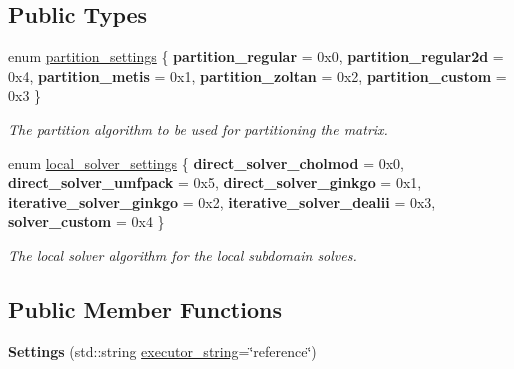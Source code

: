 \subsection*{Public Types}
\begin{DoxyCompactItemize}
\item 
\mbox{\label{structschwz_1_1Settings_a11769093e4aa3ce3340cbf7a67487faa}} 
enum \hyperlink{structschwz_1_1Settings_a11769093e4aa3ce3340cbf7a67487faa}{partition\+\_\+settings} \{ \newline
{\bfseries partition\+\_\+regular} = 0x0, 
{\bfseries partition\+\_\+regular2d} = 0x4, 
{\bfseries partition\+\_\+metis} = 0x1, 
{\bfseries partition\+\_\+zoltan} = 0x2, 
\newline
{\bfseries partition\+\_\+custom} = 0x3
 \}\begin{DoxyCompactList}\small\item\em The partition algorithm to be used for partitioning the matrix. \end{DoxyCompactList}
\item 
\mbox{\label{structschwz_1_1Settings_a31e82310ef6aed08168baef78f0db69e}} 
enum \hyperlink{structschwz_1_1Settings_a31e82310ef6aed08168baef78f0db69e}{local\+\_\+solver\+\_\+settings} \{ \newline
{\bfseries direct\+\_\+solver\+\_\+cholmod} = 0x0, 
{\bfseries direct\+\_\+solver\+\_\+umfpack} = 0x5, 
{\bfseries direct\+\_\+solver\+\_\+ginkgo} = 0x1, 
{\bfseries iterative\+\_\+solver\+\_\+ginkgo} = 0x2, 
\newline
{\bfseries iterative\+\_\+solver\+\_\+dealii} = 0x3, 
{\bfseries solver\+\_\+custom} = 0x4
 \}\begin{DoxyCompactList}\small\item\em The local solver algorithm for the local subdomain solves. \end{DoxyCompactList}
\end{DoxyCompactItemize}
\subsection*{Public Member Functions}
\begin{DoxyCompactItemize}
\item 
\mbox{\label{structschwz_1_1Settings_a00ac65d16e2ef2761fad0095b2ba3086}} 
{\bfseries Settings} (std\+::string \hyperlink{structschwz_1_1Settings_a088ed3524456a1fd40e76b0e2d624c79}{executor\+\_\+string}=\char`\"{}reference\char`\"{})
\end{DoxyCompactItemize}
